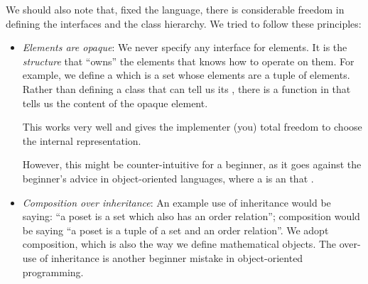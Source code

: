 We should also note that, fixed the language, there is considerable freedom in defining the interfaces and the class hierarchy.
We tried to follow these principles:
\begin{itemize}
    \item \emph{Elements are opaque}: We never specify any interface for elements.
          It is the \emph{structure} that ``owns'' the elements that knows how to operate on them.
          For example, we define a  which is a set whose elements are a tuple of elements.
          Rather than defining a class  that can tell us its , there is a function  in  that tells us the content of the opaque element.

          This works very well and gives the implementer (you) total freedom to choose the internal representation.

          However, this might be counter-intuitive for a beginner, as it goes against the beginner's advice in object-oriented languages, where a  is an  that .

    \item \emph{Composition over inheritance}: An example use of inheritance would be saying: ``a poset is a set which also has an order relation''; composition would be saying ``a poset is a tuple of a set and an order relation''.
          We adopt composition, which is also the way we define mathematical objects.
          The over-use of inheritance is another beginner mistake in object-oriented programming.
\end{itemize}
